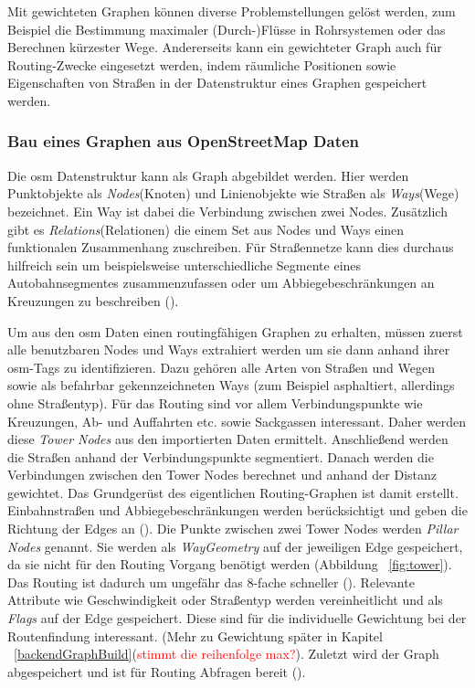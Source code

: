 \documentclass[12pt,a4paper]{article}
\newcommand\todo[1]{\textcolor{red}{#1}}
\begin{document}
Mit gewichteten Graphen können diverse Problemstellungen gelöst werden, zum Beispiel die Bestimmung maximaler (Durch-)Flüsse in Rohrsystemen oder das Berechnen kürzester Wege. Andererseits kann ein gewichteter Graph auch für Routing-Zwecke eingesetzt werden, indem räumliche Positionen sowie Eigenschaften von Straßen in der Datenstruktur eines Graphen gespeichert werden.

\subsubsection{Bau eines Graphen aus OpenStreetMap Daten}
\label{sec:osmgraph}

Die \gls{osm} Datenstruktur kann als Graph abgebildet werden. Hier werden Punktobjekte als \textit{Nodes}(Knoten) und Linienobjekte wie Straßen als \textit{Ways}(Wege) bezeichnet. Ein Way ist dabei die Verbindung zwischen zwei Nodes. Zusätzlich gibt es \textit{Relations}(Relationen) die einem Set aus Nodes und Ways einen funktionalen Zusammenhang zuschreiben. Für Straßennetze kann dies durchaus hilfreich sein um beispielsweise unterschiedliche Segmente eines Autobahnsegmentes zusammenzufassen oder um Abbiegebeschränkungen an Kreuzungen zu beschreiben (\cite{osmrelation}).

Um aus den \gls{osm} Daten einen routingfähigen Graphen zu erhalten, müssen zuerst alle benutzbaren Nodes und Ways extrahiert werden um sie dann anhand ihrer \gls{osm}-Tags zu identifizieren. Dazu gehören alle Arten von Straßen und Wegen sowie als befahrbar gekennzeichneten Ways (zum Beispiel asphaltiert, allerdings ohne Straßentyp). Für das Routing sind vor allem Verbindungspunkte wie Kreuzungen, Ab- und Auffahrten etc. sowie Sackgassen interessant. Daher werden diese \textit{Tower Nodes} aus den importierten Daten ermittelt. Anschließend werden die Straßen anhand der Verbindungspunkte segmentiert. Danach werden die Verbindungen zwischen den Tower Nodes berechnet und anhand der Distanz gewichtet. Das Grundgerüst des eigentlichen Routing-Graphen ist damit erstellt. Einbahnstraßen und Abbiegebeschränkungen werden berücksichtigt und geben die Richtung der Edges an (\cite{osmgraph}). Die Punkte zwischen zwei Tower Nodes werden \textit{Pillar Nodes} genannt. Sie werden als \textit{WayGeometry} auf der jeweiligen Edge gespeichert, da sie nicht für den Routing Vorgang benötigt werden (Abbildung ~\ref{fig:tower}). Das Routing ist dadurch um ungefähr das 8-fache schneller (\cite{graphhopper}). Relevante Attribute wie Geschwindigkeit oder Straßentyp werden vereinheitlicht und als \textit{Flags} auf der Edge gespeichert. Diese sind für die individuelle Gewichtung bei der Routenfindung interessant. (Mehr zu Gewichtung später in Kapitel ~\ref{backendGraphBuild}(\todo{stimmt die reihenfolge max?}). Zuletzt wird der Graph abgespeichert und ist für Routing Abfragen bereit (\cite{osmgraph}). 
\end{document}

